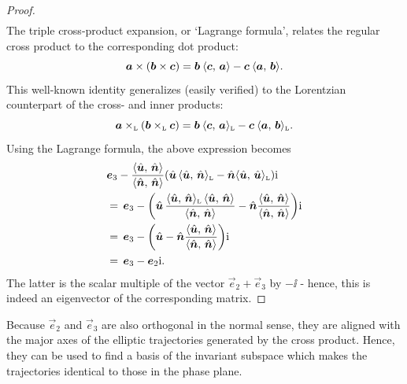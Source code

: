 \begin{proof}
\begin{equation*}
\begin{split}
        \end{split}
    \end{equation*}
The triple cross-product expansion, or `Lagrange formula', relates the regular cross product to the corresponding dot product:
    $$ \vec{a}\times\qty(\vec{b}\times\vec{c}) = \vec{b}\:\inner{\vec{c}}{\vec{a}} - \vec{c}\:\inner{\vec{a}}{\vec{b}}. $$
This well-known identity generalizes (easily verified) to the Lorentzian counterpart of the cross- and inner products:
    $$ 
        \lorcrossp{\vec{a}}{\qty(\lorcrossp{\vec{b}}{\vec{c}})} 
       = \vec{b}\:\lorinner{\vec{c}}{\vec{a}} - \vec{c}\:\lorinner{\vec{a}}{\vec{b}}. 
    $$
Using the Lagrange formula, the above expression becomes
    \begin{equation*}
        \begin{split}
            & \vec{e}_3 - \frac{ \inner{\uvec{u}}{\uvec{n}} }{ \inner{\uvec{n}}{\uvec{n}} }\qty(\uvec{u}\,\lorinner{\uvec{u}}{\uvec{n}} - \uvec{n}\lorinner{\uvec{u}}{\uvec{u}})\ii \\
            & =\, \vec{e}_3 - \qty(\uvec{u}\,\frac{ \lorinner{\uvec{u}}{\uvec{n}} \, \inner{\uvec{u}}{\uvec{n}} }{ \inner{\uvec{n}}{\uvec{n}} } - \uvec{n}\frac{ \inner{\uvec{u}}{\uvec{n}} }{ \inner{\uvec{n}}{\uvec{n}} })\ii \\
            & =\, \vec{e}_3 - \qty(\uvec{u} - \uvec{n}\frac{ \inner{\uvec{u}}{\uvec{n}} }{ \inner{\uvec{n}}{\uvec{n}} })\ii \\
            & =\, \vec{e}_3 - \vec{e}_2\ii. 
        \end{split}
    \end{equation*}
    The latter is the scalar multiple of the vector $\vec{e}_2 + \vec{e}_3$ by $-\ii$ - hence, this is indeed an eigenvector of the corresponding matrix.
\end{proof}
Because $\vec{e}_2$ and $\vec{e}_3$ are also orthogonal in the normal sense, they are aligned with the major axes of the elliptic trajectories generated by the cross product. Hence, they can be used to find a basis of the invariant subspace which makes the trajectories identical to those in the phase plane.


